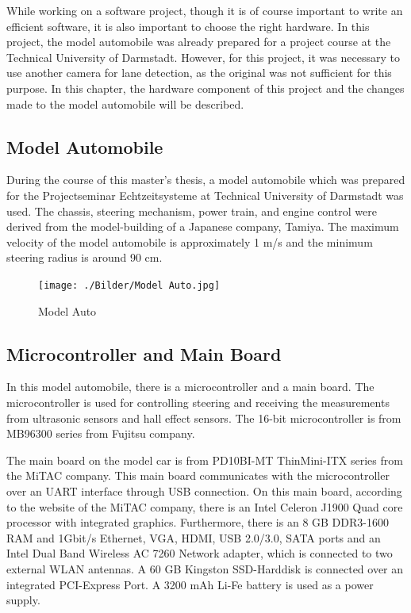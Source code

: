 While working on a software project, though it is of course important to write an efficient software, it is also important to choose the right hardware. In this project, the model automobile was already prepared for a project course at the Technical University of Darmstadt. However, for this project, it was necessary to use another camera for lane detection, as the original was not sufficient for this purpose. In this chapter, the hardware component of this project and the changes made to the model automobile will be described.


%
\subsection{Model Automobile}\label{sec:Model Auto}


During the course of this master's thesis, a model automobile which was prepared for the Projectseminar Echtzeitsysteme at Technical University of Darmstadt was used. The chassis, steering mechanism, power train, and engine control were derived from the model-building of a Japanese company, Tamiya. The maximum velocity of the model automobile is approximately\cite{Bachelorthesis_Nicolas} 1 m/s and the minimum steering radius is around\cite{Bachelorthesis_Nicolas} 90 cm. 

\begin{figure}[H]
	\centering
	\hspace*{0cm}   
	\texttt{[image: ./Bilder/Model Auto.jpg]}
	\caption{Model Auto}
\end{figure}

%
\subsection{Microcontroller and Main Board}\label{sec:Microcontroller and Main Board}


In this model automobile, there is a microcontroller and a main board. The microcontroller is used for controlling steering 
and receiving the measurements from ultrasonic sensors and hall effect sensors. The 16-bit microcontroller is from 
MB96300 series from Fujitsu company.

The main board on the model car is from PD10BI-MT ThinMini-ITX series from the MiTAC company. This main board communicates 
with the microcontroller over an UART interface through USB connection. On this main board, according to the website of the MiTAC company\cite{PD10BIMT}, there is an Intel Celeron J1900 Quad core processor with integrated graphics. Furthermore, there is an 8 GB DDR3-1600 RAM and 1Gbit/s Ethernet, VGA, HDMI, USB 2.0/3.0, SATA ports and an Intel Dual Band Wireless AC 7260 Network adapter, which is connected to two external WLAN antennas. A 60 GB Kingston SSD-Harddisk is connected over an integrated PCI-Express Port. A 3200 mAh Li-Fe battery is used as a power supply.
%

